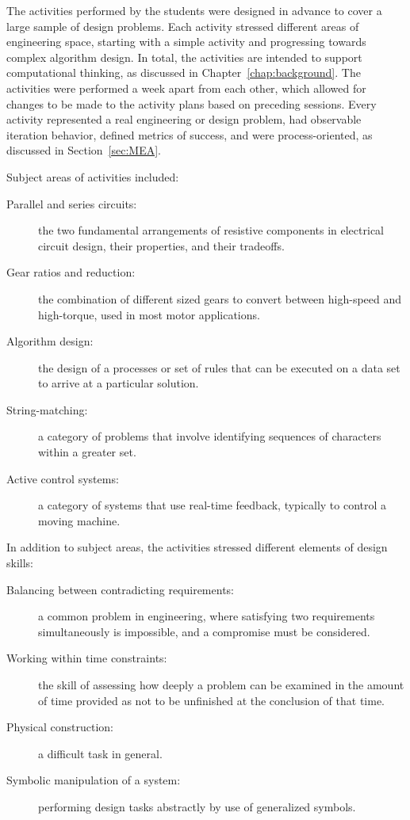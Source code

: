 The activities performed by the students were designed in advance to cover a large sample of design problems.  Each activity stressed different areas of engineering space, starting with a simple activity and progressing towards complex algorithm design. In total, the activities are intended to support computational thinking, as discussed in Chapter~\ref{chap:background}.  The activities were performed a week apart from each other, which allowed for changes to be made to the activity plans based on preceding sessions. Every activity represented a real engineering or design problem, had observable iteration behavior, defined metrics of success, and were process-oriented, as discussed in Section~\ref{sec:MEA}.

Subject areas of activities included:
\begin{description}
\item [Parallel and series circuits:] the two fundamental arrangements of resistive components in electrical circuit design, their properties, and their tradeoffs. 
\item [Gear ratios and reduction:] the combination of different sized gears to convert between high-speed and high-torque, used in most motor applications.
\item [Algorithm design:] the design of a processes or set of rules that can be executed on a data set to arrive at a particular solution.
\item [String-matching:] a category of problems that involve identifying sequences of characters within a greater set. 
\item [Active control systems:] a category of systems that use real-time feedback, typically to control a moving machine.
\end{description}
In addition to subject areas, the activities stressed different elements of design skills:
\begin{description}
\item [Balancing between contradicting requirements:] a common problem in engineering, where satisfying two requirements simultaneously is impossible, and a compromise must be considered.
\item [Working within time constraints:] the skill of assessing how deeply a problem can be examined in the amount of time provided as not to be unfinished at the conclusion of that time.
\item [Physical construction:] a difficult task in general.
\item [Symbolic manipulation of a system:] performing design tasks abstractly by use of generalized symbols.
\end{description}



